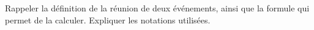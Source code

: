 
\begin{exercice}\label{exosmath-0184}

    Rappeler la définition de la réunion de deux événements, ainsi que la formule qui permet de la calculer. Expliquer les notations utilisées.

\end{exercice}

